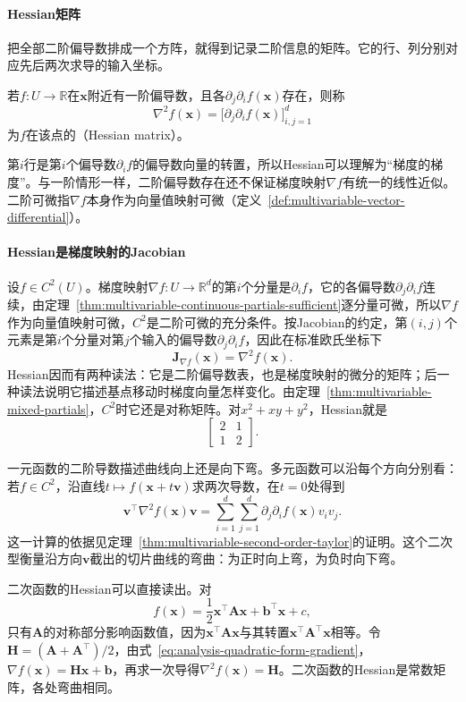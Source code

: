 \paragraph{Hessian矩阵}
把全部二阶偏导数排成一个方阵，就得到记录二阶信息的矩阵。它的行、列分别对应先后两次求导的输入坐标。
\begin{definition}[Hessian矩阵]
\label{def:multivariable-hessian}
若$f:U\to\mathbb R$在$\bm x$附近有一阶偏导数，且各$\partial_j\partial_i f(\bm x)$存在，则称
\[
 \nabla^2f(\bm x)=\bigl[\partial_j\partial_i f(\bm x)\bigr]_{i,j=1}^d
\]
为$f$在该点的（Hessian matrix）。
\end{definition}
第$i$行是第$i$个偏导数$\partial_if$的偏导数向量的转置，所以Hessian可以理解为“梯度的梯度”。与一阶情形一样，二阶偏导数存在还不保证梯度映射$\nabla f$有统一的线性近似。二阶可微指$\nabla f$本身作为向量值映射可微（定义~\ref{def:multivariable-vector-differential}）。

\paragraph{Hessian是梯度映射的Jacobian}
设$f\in C^2(U)$。梯度映射$\nabla f:U\to\mathbb R^d$的第$i$个分量是$\partial_if$，它的各偏导数$\partial_j\partial_if$连续，由定理~\ref{thm:multivariable-continuous-partials-sufficient}逐分量可微，所以$\nabla f$作为向量值映射可微，$C^2$是二阶可微的充分条件。按Jacobian的约定，第$(i,j)$个元素是第$i$个分量对第$j$个输入的偏导数$\partial_j\partial_if$，因此在标准欧氏坐标下
\[
 \bm J_{\nabla f}(\bm x)=\nabla^2f(\bm x).
\]
Hessian因而有两种读法：它是二阶偏导数表，也是梯度映射的微分的矩阵；后一种读法说明它描述基点移动时梯度向量怎样变化。由定理~\ref{thm:multivariable-mixed-partials}，$C^2$时它还是对称矩阵。对$x^2+xy+y^2$，Hessian就是
\[
 \begin{bmatrix}2&1\\1&2\end{bmatrix}.
\]

一元函数的二阶导数描述曲线向上还是向下弯。多元函数可以沿每个方向分别看：若$f\in C^2$，沿直线$t\mapsto f(\bm x+t\bm v)$求两次导数，在$t=0$处得到
\[
 \bm v^\top\nabla^2f(\bm x)\bm v
 =\sum_{i=1}^d\sum_{j=1}^d \partial_j\partial_i f(\bm x)v_i v_j.
\]
这一计算的依据见定理~\ref{thm:multivariable-second-order-taylor}的证明。这个二次型衡量沿方向$\bm v$截出的切片曲线的弯曲：为正时向上弯，为负时向下弯。

二次函数的Hessian可以直接读出。对
\[
 f(\bm{x})=\frac12\bm{x}^{\top}\bm{A}\bm{x}+\bm{b}^{\top}\bm{x}+c,
\]
只有$\bm{A}$的对称部分影响函数值，因为$\bm x^\top\bm A\bm x$与其转置$\bm x^\top\bm A^\top\bm x$相等。令$\bm{H}=(\bm{A}+\bm{A}^{\top})/2$，由式~\eqref{eq:analysis-quadratic-form-gradient}，$\nabla f(\bm{x})=\bm{H}\bm{x}+\bm{b}$，再求一次导得$\nabla^2f(\bm{x})=\bm{H}$。二次函数的Hessian是常数矩阵，各处弯曲相同。

